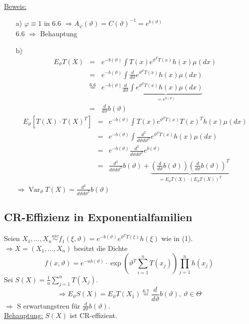 \documentclass[a4paper,11pt,twoside,titlepage]{article}
\newcommand{\uiv}{\ensuremath{\stackrel{uiv}{\sim}}}
\DeclareMathOperator{\var}{Var}
\begin{document}
\underline{Beweis:}
\begin{itemize}
\item[a) ]$\varphi\equiv1$ in 6.6 $\Rightarrow A_\varphi(\vartheta)=C(\vartheta)^{-1}=e^{b(\vartheta)}$\\
6.6 $\Rightarrow$ Behauptung
\item[b) ]
\begin{eqnarray*}
E_\vartheta T(X)&=&e^{-b(\vartheta)}\int T(x)e^{\vartheta^T T(x)}h(x)\mu(dx)\\
&=&e^{-b(\vartheta)}\int \frac{d}{d\vartheta}e^{\vartheta^T T(x)}h(x)\mu(dx)\\
&\stackrel{6.6}{=}&e^{-b(\vartheta)}\frac{d}{d\vartheta}\underbrace{\int e^{\vartheta^T T(x)}h(x)\mu(dx)}_{=e^{b(\vartheta)}}\\
&=&\frac{d}{d\vartheta}b(\vartheta)\end{eqnarray*}
\begin{eqnarray*}
E_\vartheta [T(X)\cdot T(X)^T]&=&e^{-b(\vartheta)}\int T(x)e^{\vartheta^T T(x)}T(x)^Th(x)\mu(dx)\\
&=&e^{-b(\vartheta)}\int \frac{d^2}{d\vartheta d\vartheta^T}e^{\vartheta^T T(x)}h(x)\mu(dx)\\
&=&e^{-b(\vartheta)}\frac{d^2}{d\vartheta d\vartheta^T}e^{b(\vartheta)}\\
&=&\frac{d^2}{d\vartheta d\vartheta^T}b(\vartheta)+\underbrace{(\frac{d}{d\vartheta}b(\vartheta))(\frac{d}{d\vartheta}b(\vartheta))^T}_{=E_\vartheta T(X)\cdot (E_\vartheta T(X))^T}\end{eqnarray*}
$\Rightarrow \var_\vartheta T(X)=\frac{d^2}{d\vartheta d\vartheta^T}b(\vartheta)$
\end{itemize}

\subsection{CR-Effizienz in Exponentialfamilien}
Seien $X_1,\ldots,X_n\uiv f_1(\xi,\vartheta)=e^{-b(\vartheta)}e^{\vartheta^T T(\xi)}h(\xi)$ wie in (1).\\
$\Rightarrow X=(X_1,\ldots,X_n)$ besitzt die Dichte
\[f(x,\vartheta)=e^{-nb(\vartheta)}\cdot\exp(\vartheta^T \sum_{i=1}^n T(x_j))\prod_{j=1}^nh(x_j)\]
Sei $S(X)=\frac1n\sum_{j=1}^n T(X_j)$.
\[\Rightarrow E_\vartheta S(X)=E_\vartheta T(X_1)\stackrel{6.7}{=}\frac{d}{d\vartheta}b(\vartheta),\ \vartheta\in\Theta\]
$\Rightarrow$ S erwartungstreu für $\frac{d}{d\vartheta}b(\vartheta)$.\\
\underline{Behauptung:} $S(X)$ ist CR-effizient.
\end{document}
